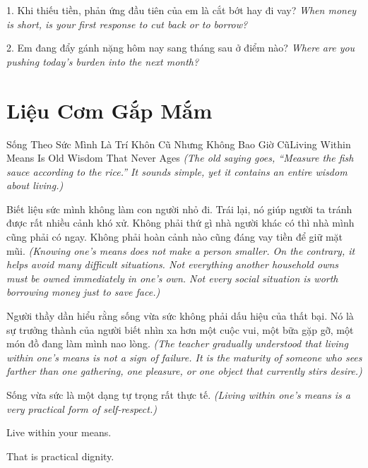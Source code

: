 \begin{tuhocnhanh}
1. Khi thiếu tiền, phản ứng đầu tiên của em là cắt bớt hay đi vay? \textit{When money is short, is your first response to cut back or to borrow?}

2. Em đang đẩy gánh nặng hôm nay sang tháng sau ở điểm nào? \textit{Where are you pushing today’s burden into the next month?}
\end{tuhocnhanh}
\ngancach

\section{Liệu Cơm Gắp Mắm}
\begin{truyen}{Sống Theo Sức Mình Là Trí Khôn Cũ Nhưng Không Bao Giờ Cũ}{Living Within Means Is Old Wisdom That Never Ages}
\textit{(The old saying goes, ``Measure the fish sauce according to the rice.'' It sounds simple, yet it contains an entire wisdom about living.)}

Biết liệu sức mình không làm con người nhỏ đi. Trái lại, nó giúp người ta tránh được rất nhiều cảnh khó xử. Không phải thứ gì nhà người khác có thì nhà mình cũng phải có ngay. Không phải hoàn cảnh nào cũng đáng vay tiền để giữ mặt mũi.
\textit{(Knowing one’s means does not make a person smaller. On the contrary, it helps avoid many difficult situations. Not everything another household owns must be owned immediately in one’s own. Not every social situation is worth borrowing money just to save face.)}

Người thầy dần hiểu rằng sống vừa sức không phải dấu hiệu của thất bại. Nó là sự trưởng thành của người biết nhìn xa hơn một cuộc vui, một bữa gặp gỡ, một món đồ đang làm mình nao lòng.
\textit{(The teacher gradually understood that living within one’s means is not a sign of failure. It is the maturity of someone who sees farther than one gathering, one pleasure, or one object that currently stirs desire.)}
\end{truyen}

\begin{baihoc}
Sống vừa sức là một dạng tự trọng rất thực tế.
\textit{(Living within one’s means is a very practical form of self-respect.)}
\end{baihoc}

\begin{ghinhoanh}
Live within your means.

That is practical dignity.
\end{ghinhoanh}


